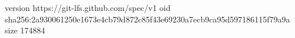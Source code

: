 version https://git-lfs.github.com/spec/v1
oid sha256:2a930061250e1673e4cb79d872c85f43e69230a7ecb9ca95d597186115f79a9a
size 174884
